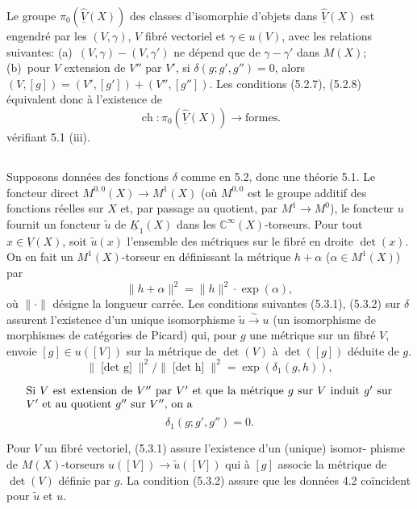 \documentclass[12pt,a4paper]{article}
\theoremstyle{plain}
\theoremstyle{definition}
\DeclareMathOperator{\ch}{ch}
\newcommand{\CC}{\mathbb{C}}
\begin{document}
Le groupe $\pi_0(\widehat{\underline{V}}(X))$ des classes d'isomorphie d'objets dans $\widehat{\underline{V}}(X)$ est engendr\'e
par les $(V, \gamma)$, $V$ fibr\'e vectoriel et $\gamma \in u(V)$, avec les relations suivantes:
(a)~$(V, \gamma) - (V, \gamma')$ ne d\'epend que de $\gamma - \gamma'$ dans $M(X)$; (b)~pour $V$ extension
de $V''$ par $V'$, si $\delta(g; g', g'') = 0$, alors $(V, [g]) = (V', [g']) + (V'', [g''])$.
Les conditions (5.2.7), (5.2.8) \'equivalent donc \`a l'existence de
\[
\ch: \pi_0(\widehat{\underline{V}}(X)) \longrightarrow \text{formes} .
\]
v\'erifiant 5.1 (iii).

\subsection{}

Supposons donn\'ees des fonctions $\delta$ comme en 5.2, donc une th\'eorie 5.1.
Le foncteur direct $M^{0,0}(X) \to M^1(X)$ (o\`u $M^{0,0}$ est le groupe additif des fonctions r\'eelles
sur $X$ et, par passage au quotient, par $M^1 \to M^0$), le foncteur $u$ fournit un
foncteur $\tilde{u}$ de $\underline{K}_1(X)$ dans les $\CC^\infty(X)$-torseurs. Pour tout $x \in \underline{V}(X)$, soit
$\tilde{u}(x)$ l'ensemble des m\'etriques sur le fibr\'e en droite $\det(x)$. On en fait un
$M^1(X)$-torseur en d\'efinissant la m\'etrique $h + \alpha$ ($\alpha \in M^1(X)$) par
\[
\|h + \alpha\|^2 = \|h\|^2 \cdot \exp(\alpha) ,
\]
o\`u $\|\cdot\|$ d\'esigne la longueur carr\'ee. Les conditions suivantes (5.3.1), (5.3.2)
sur $\delta$ assurent l'existence d'un unique isomorphisme $\tilde{u} \xrightarrow{\sim} u$ (un isomorphisme
de morphismes de cat\'egories de Picard) qui, pour $g$ une m\'etrique sur un fibr\'e
$V$, envoie $[g] \in u([V])$ sur la m\'etrique de $\det(V)$ \`a $\det([g])$ d\'eduite de $g$.
\begin{equation}\label{eq:5.3.1}
\|\textrm{[$\det$ g]}\|^2 / \|\textrm{[$\det$ h]}\|^2 = \exp(\delta_1(g, h)),
\end{equation}

\begin{equation}\label{eq:5.3.2}
\parbox{\dimexpr\linewidth-2em}{%
Si $V$ est extension de $V''$ par $V'$ et que la m\'etrique $g$ sur $V$
induit $g'$ sur $V'$ et au quotient $g''$ sur $V''$, on a}
\end{equation}
\[
\delta_1(g; g', g'') = 0 .
\]

Pour $V$ un fibr\'e vectoriel, (5.3.1) assure l'existence d'un (unique) isomor-
phisme de $M(X)$-torseurs $u([V]) \to \tilde{u}([V])$ qui \`a $[g]$ associe la m\'etrique de
$\det(V)$ d\'efinie par $g$. La condition (5.3.2) assure que les donn\'ees 4.2 co\"incident
pour $\tilde{u}$ et $u$.
\end{document}
